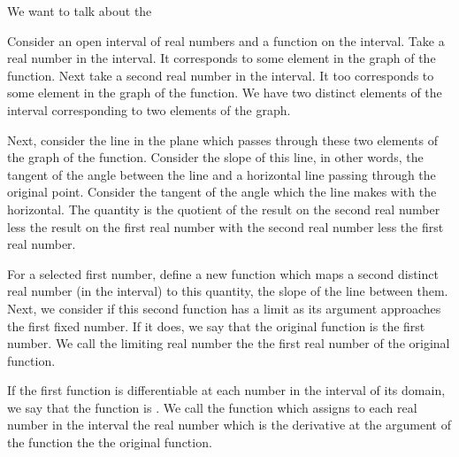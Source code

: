 
\sbasic



















\sstart
{}


We want to talk about
the


Consider an open interval of
real numbers and a function on
the interval.
Take a real number in the interval.
It corresponds to some element in
the graph of the function.
Next take a second real number in the interval.
It too corresponds to some element in
the graph of the function.
We have two distinct elements of the
interval corresponding to two elements of the graph.

Next, consider the line in the plane which passes
through these two elements of the graph of the
function.
Consider the slope of this line, in other words,
the tangent of the angle between the line
and a horizontal line passing through the
original point.
Consider the tangent of the angle which the line
makes with the horizontal.
The quantity is the quotient
of the result on the second real number
less the result on the first real number
with the second real number less the first
real number.

For a selected first number,
define a new function which maps
a second distinct real number (in the interval)
to this quantity, the slope of the line
between them.
Next, we consider if this second function
has a limit as its argument approaches
the first fixed number.
If it does, we say that the original function is
 the first number.
We call the limiting real number the
 the first real number of
the original function.

If the first function is differentiable at
each number in the interval of its domain,
we say that the function is .
We call the function which assigns to each
real number in the interval the real number
which is the derivative at the argument of
the function the  the
original function.

